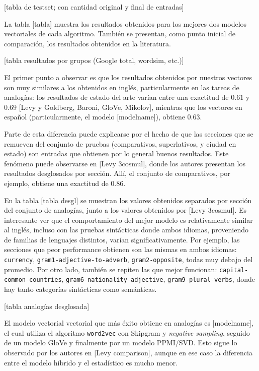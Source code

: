 [tabla de testset; con cantidad original y final de entradas]

\quad

La tabla [tabla] muestra los resultados obtenidos para los mejores dos modelos vectoriales de cada
algoritmo. También se presentan, como punto inicial de comparación, los resultados obtenidos en la
literatura.

[tabla resultados por grupos (Google total, wordsim, etc.)]

El primer punto a observar es que los resultados obtenidos por nuestros vectores son muy similares a
los obtenidos en inglés, particularmente en las tareas de analogías: los resultados de estado del
arte varían entre una exactitud de $0.61$ y $0.69$ [Levy y Goldberg, Baroni, GloVe, Mikolov],
mientras que los vectores en español (particularmente, el modelo [modelname]), obtiene $0.63$.

Parte de esta diferencia puede explicarse por el hecho de que las secciones que se remueven del
conjunto de pruebas (comparativos, superlativos, y ciudad en estado) son entradas que obtienen por
lo general buenos resultados. Este fenómeno puede observarse en [Levy 3cosmul], donde los autores
presentan los resultados desglosados por sección. Allí, el conjunto de comparativos, por ejemplo,
obtiene una exactitud de $0.86$.

En la tabla [tabla desgl] se muestran los valores obtenidos separados por sección del conjunto de
analogías, junto a los valores obtenidos por [Levy 3cosmul]. Es interesante ver que el
comportamiento del mejor modelo es relativamente similar al inglés, incluso con las pruebas
sintácticas donde ambos idiomas, proveniendo de familias de lenguajes distintos, varían
significativamente. Por ejemplo, las secciones que peor performance obtienen son las mismas en ambos
idiomas: \texttt{currency}, \texttt{gram1-adjective-to-adverb}, \texttt{gram2-opposite}, todas muy
debajo del promedio. Por otro lado, también se repiten las que mejor funcionan:
\texttt{capital-common-countries}, \texttt{gram6-nationality-adjective},
\texttt{gram9-plural-verbs}, donde hay tanto categorías sintácticas como semánticas.

[tabla analogías desglosada]

El modelo vectorial vectorial que más éxito obtiene en analogías es [modelname], el cual utiliza el
algoritmo \texttt{word2vec} con Skipgram y \textit{negative sampling}, seguido de un modelo GloVe y
finalmente por un modelo PPMI/SVD\@. Esto sigue lo observado por los autores en [Levy comparison],
aunque en ese caso la diferencia entre el modelo híbrido y el estadístico es mucho menor.

